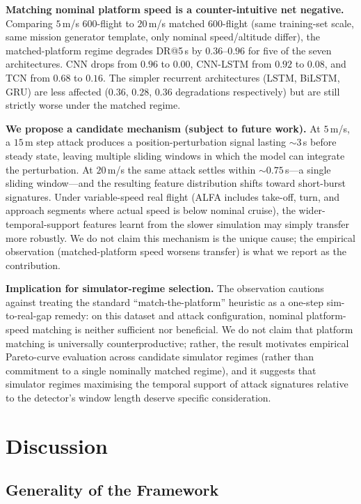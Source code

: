 \documentclass{ieeeaccess}
\begin{document}
\textbf{Matching nominal platform speed is a counter-intuitive net negative.}
Comparing $5$\,m/s 600-flight to $20$\,m/s matched 600-flight (same
training-set scale, same mission generator template, only nominal
speed/altitude differ), the matched-platform regime degrades
DR@5\,s by $0.36$--$0.96$ for five of the seven architectures.
CNN drops from $0.96$ to $0.00$, CNN-LSTM from $0.92$ to $0.08$, and
TCN from $0.68$ to $0.16$.
The simpler recurrent architectures (LSTM, BiLSTM, GRU) are less
affected ($0.36$, $0.28$, $0.36$ degradations respectively) but are
still strictly worse under the matched regime.

\textbf{We propose a candidate mechanism (subject to future work).}
At $5$\,m/s, a $15$\,m step attack produces a position-perturbation
signal lasting $\sim 3$\,s before steady state, leaving multiple
sliding windows in which the model can integrate the perturbation.
At $20$\,m/s the same attack settles within $\sim 0.75$\,s---a single
sliding window---and the resulting feature distribution shifts toward
short-burst signatures. Under variable-speed real flight (ALFA includes
take-off, turn, and approach segments where actual speed is below
nominal cruise), the wider-temporal-support features learnt from the
slower simulation may simply transfer more robustly. We do not claim
this mechanism is the unique cause; the empirical observation
(matched-platform speed worsens transfer) is what we report as the
contribution.

\textbf{Implication for simulator-regime selection.}
The observation cautions against treating the standard
``match-the-platform'' heuristic as a one-step sim-to-real-gap remedy:
on this dataset and attack configuration, nominal platform-speed matching
is neither sufficient nor beneficial. We do not claim that platform
matching is universally counterproductive; rather, the result motivates
empirical Pareto-curve evaluation across candidate simulator regimes
(rather than commitment to a single nominally matched regime), and it
suggests that simulator regimes maximising the temporal support of
attack signatures relative to the detector's window length deserve
specific consideration.

\section{Discussion}
\label{sec:discussion}

\subsection{Generality of the Framework}
\end{document}
